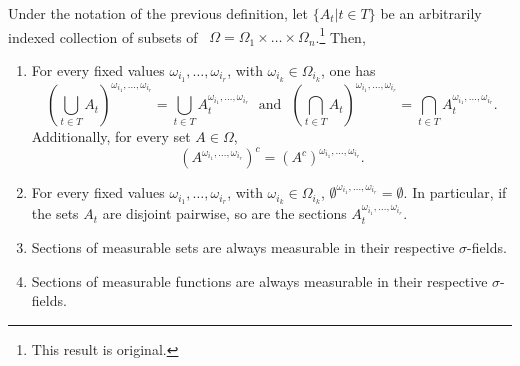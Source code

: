 \begin{prop}\label{proposition:properties of sections}Under the notation of the previous definition, let \(\{A_t\left|t\in T\right.\}\) be an arbitrarily indexed collection of subsets of ~\(\Omega=\Omega_1\times\dots\times\Omega_n\).\footnote{This result is original.} Then,

\begin{enumerate}
    \item\label{proposition:properties of sections 1} For every fixed values \(\omega_{i_1},\dots,\omega_{i_r}\), with \(\omega_{i_k}\in\Omega_{i_k}\), one has
    \[
        \left(\bigcup_{t\in T}A_t\right)^{\omega_{i_1},\dots,\omega_{i_r}}= \bigcup_{t\in T} A_t^{\omega_{i_1},\dots,\omega_{i_r}} \text{ ~and~ }
        \left(\bigcap_{t\in T}A_t\right)^{\omega_{i_1},\dots,\omega_{i_r}}= \bigcap_{t\in T} A_t^{\omega_{i_1},\dots,\omega_{i_r}} 
    .\]
    Additionally, for every set \(A\in\Omega\),
        \[\left(A^{\omega_{i_1},\dots,\omega_{i_r}}\right)^{c}=\left(A^c\right)^{\omega_{i_1},\dots,\omega_{i_r}}.\]

    \item\label{proposition:properties of sections 2} For every fixed values \(\omega_{i_1},\dots,\omega_{i_r}\), with \(\omega_{i_k}\in\Omega_{i_k}\), \(\emptyset^{\omega_{i_1},\dots,\omega_{i_r}}=\emptyset\). In particular, if the sets \(A_t\) are disjoint pairwise, so are the sections 
    \(A_t^{\omega_{i_1},\dots,\omega_{i_r}}\).
    \item\label{proposition:properties of sections 3} Sections of measurable sets are always measurable in their respective \(\sigma\)-fields.
		\item\label{proposition:properties of sections 4} Sections of measurable functions are always measurable in their respective \(\sigma\)-fields.
\end{enumerate}
\end{prop}
